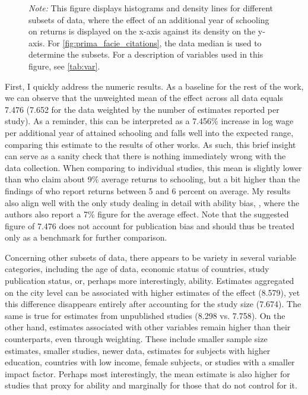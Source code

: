 \begin{figure}[!htbp]
\begin{center}
\end{center}\vspace{-0.6cm}
\captionsetup{width=0.75\textwidth, font = scriptsize}
\caption*{\emph{Note:} This figure displays histograms and density lines for different subsets of data, where the effect of an additional year of schooling on returns is displayed on the x-axis against its density on the y-axis. For \autoref{fig:prima_facie_citations}, the data median is used to determine the subsets. For a description of variables used in this figure, see \autoref{tab:var}.}
\end{figure}


First, I quickly address the numeric results. As a baseline for the rest of the work, we can observe that the unweighted mean of the effect across all data equals 7.476 (7.652 for the data weighted by the number of estimates reported per study). As a reminder, this can be interpreted as a 7.456\% increase in log wage per additional year of attained schooling and falls well into the expected range, comparing this estimate to the results of other works. As such, this brief insight can serve as a sanity check that there is nothing immediately wrong with the data collection. When comparing to individual studies, this mean is slightly lower than \cite{psacharopoulos2018meta} who claim about 9\% average returns to schooling, but a bit higher than the findings of \cite{fleisher2005meta} who report returns between 5 and 6 percent on average. My results also align well with the only study dealing in detail with ability bias, \cite{wincenciak2022meta}, where the authors also report a 7\% figure for the average effect. Note that the suggested figure of 7.476 does not account for publication bias and should thus be treated only as a benchmark for further comparison.

Concerning other subsets of data, there appears to be variety in several variable categories, including the age of data, economic status of countries, study publication status, or, perhaps more interestingly, ability. Estimates aggregated on the city level can be associated with higher estimates of the effect (8.579), yet this difference disappears entirely after accounting for the study size (7.674). The same is true for estimates from unpublished studies (8.298 vs. 7.758). On the other hand, estimates associated with other variables remain higher than their counterparts, even through weighting. These include smaller sample size estimates, smaller studies, newer data, estimates for subjects with higher education, countries with low income, female subjects, or studies with a smaller impact factor. Perhaps most interestingly, the mean estimate is also higher for studies that proxy for ability and marginally for those that do not control for it.

